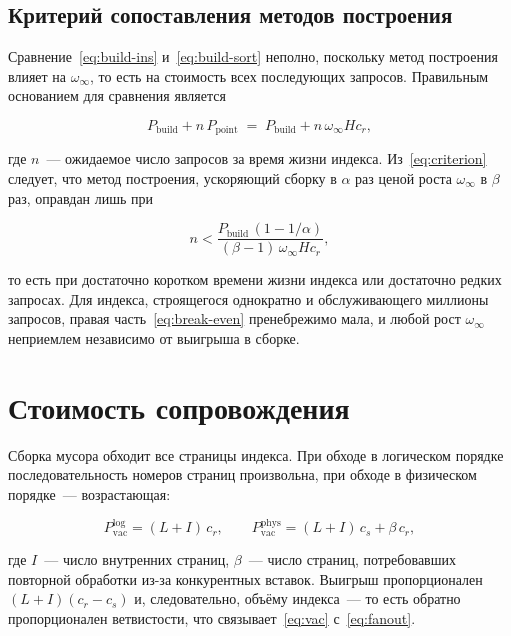 \subsection{Критерий сопоставления методов построения}

Сравнение~\eqref{eq:build-ins} и~\eqref{eq:build-sort} неполно, поскольку метод
построения влияет на $\omega_\infty$, то есть на стоимость всех последующих
запросов. Правильным основанием для сравнения является

\begin{equation}
\label{eq:criterion}
P_{\text{build}} + n\,P_{\text{point}}
  \;=\; P_{\text{build}} + n\,\omega_\infty H c_r ,
\end{equation}

где $n$~--- ожидаемое число запросов за время жизни индекса. Из~\eqref{eq:criterion}
следует, что метод построения, ускоряющий сборку в $\alpha$ раз ценой роста
$\omega_\infty$ в $\beta$ раз, оправдан лишь при

\begin{equation}
\label{eq:break-even}
n < \frac{P_{\text{build}}\,(1 - 1/\alpha)}{(\beta - 1)\,\omega_\infty H c_r} ,
\end{equation}

то есть при достаточно коротком времени жизни индекса или достаточно редких
запросах. Для индекса, строящегося однократно и обслуживающего миллионы
запросов, правая часть~\eqref{eq:break-even} пренебрежимо мала, и любой рост
$\omega_\infty$ неприемлем независимо от выигрыша в сборке.

\section{Стоимость сопровождения}

Сборка мусора обходит все страницы индекса. При обходе в логическом порядке
последовательность номеров страниц произвольна, при обходе в физическом
порядке~--- возрастающая:

\begin{equation}
\label{eq:vac}
P^{\text{log}}_{\text{vac}} = (L+I)\,c_r ,
\qquad
P^{\text{phys}}_{\text{vac}} = (L+I)\,c_s + \beta\,c_r ,
\end{equation}

где $I$~--- число внутренних страниц, $\beta$~--- число страниц, потребовавших
повторной обработки из-за конкурентных вставок. Выигрыш пропорционален
$(L+I)(c_r-c_s)$ и, следовательно, объёму индекса~--- то есть обратно
пропорционален ветвистости, что связывает~\eqref{eq:vac} с~\eqref{eq:fanout}.

